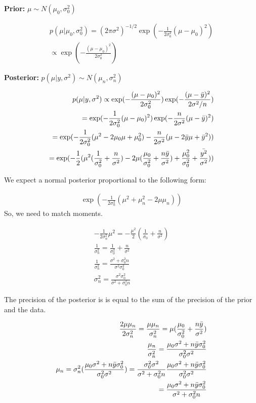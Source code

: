 \documentclass{article}
\begin{document}
\textbf{Prior:} $\mu \sim N(\mu_{0},\sigma_{0}^{2})$

\begin{align*}
    p(\mu|\mu_{0},\sigma_{0}^{2})=(2\pi\sigma^{2})^{-1/2}\exp(-\frac{1}{2\sigma_{0}^{2}}(\mu-\mu_{0})^{2}) \\ \propto \exp(-\frac{(\mu-\mu_{0})^{2}}{2\sigma_{0}^{2}})
\end{align*}

\textbf{Posterior:} $p(\mu|y,\sigma^{2}) \sim N(\mu_{n},\sigma_{n}^{2})$

\begin{align*}
    p(\mu|y,\sigma^{2}) \propto \exp(-\frac{(\mu-\mu_{0})^{2}}{2\sigma_{0}^{2}})\exp(-\frac{(\mu-\Bar{y})^{2}}{2\sigma^{2}/n}) \\
    =\exp(-\frac{1}{2\sigma_{0}^{2}}(\mu-\mu_{0})^{2})\exp(-\frac{n}{2\sigma^{2}}(\mu-\Bar{y})^{2}) \\
    =\exp(-\frac{1}{2\sigma_{0}^{2}}(\mu^{2}-2\mu_{0}\mu+\mu_{0}^{2})-\frac{n}{2\sigma^{2}}(\mu-2\Bar{y}\mu+\Bar{y}^{2}))\\
    =\exp(-\frac{1}{2}(\mu^{2}(\frac{1}{\sigma_{0}^{2}}+\frac{n}{\sigma^{2}})-2\mu(\frac{\mu_{0}}{\sigma_{0}^{2}}+\frac{n\Bar{y}}{\sigma^{2}})+\frac{\mu_{0}^{2}}{\sigma_{0}^{2}}+\frac{\Bar{y^{2}}}{\sigma^{2}}))
\end{align*}

We expect a normal posterior proportional to the following form:

\begin{align*}
    \exp(-\frac{1}{2\sigma_{n}^{2}}(\mu^{2}+\mu_{n}^{2}-2\mu\mu_{n}))
\end{align*}
\newpage
So, we need to match moments.

\begin{align*}
    -\frac{1}{2\sigma_{n}^{2}}\mu^{2}=-\frac{\mu^{2}}{2}(\frac{1}{\sigma_{0}}+\frac{n}{\sigma^{2}})\\
    \frac{1}{\sigma_{n}^{2}}=\frac{1}{\sigma_{0}^{2}}+\frac{n}{\sigma^{2}} \\
    \frac{1}{\sigma_{n}^{2}}=\frac{\sigma^{2}+\sigma_{0}^{2}n}{\sigma^{2}\sigma_{0}^{2}} \\
    \sigma_{n}^{2}=\frac{\sigma^{2}\sigma_{0}^{2}}{\sigma^{2}+\sigma_{0}^{2}n}
\end{align*}

The precision of the posterior is is equal to the sum of the precision of the prior and the data.

\begin{align*}
    \frac{2\mu\mu_{n}}{2\sigma^{2}_{n}}=\frac{\mu\mu_{n}}{\sigma^{2}_{n}}=\mu(\frac{\mu_{0}}{\sigma_{0}^{2}}+\frac{n\Bar{y}}{\sigma^{2}}) \\
    \frac{\mu_{n}}{\sigma^{2}_{n}}=\frac{\mu_{0}\sigma^{2}+n\Bar{y}\sigma_{0}^{2}}{\sigma_{0}^{2}\sigma^{2}} \\
    \mu_{n}=\sigma_{n}^{2}(\frac{\mu_{0}\sigma^{2}+n\Bar{y}\sigma_{0}^{2}}{\sigma_{0}^{2}\sigma^{2}})=\frac{\sigma_{0}^{2}\sigma^{2}}{\sigma^{2}+\sigma_{0}^{2}n}\frac{\mu_{0}\sigma^{2}+n\Bar{y}\sigma_{0}^{2}}{\sigma_{0}^{2}\sigma^{2}} \\
    =\frac{\mu_{0}\sigma^{2}+n\Bar{y}\sigma_{0}^{2}}{\sigma^{2}+\sigma_{0}^{2}n}
\end{align*}
\end{document}
